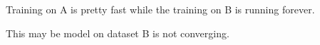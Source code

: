 \begin{answer}
    Training on A is pretty fast while the training on B is running forever.

    This may be model on dataset B is not converging.
\end{answer}
